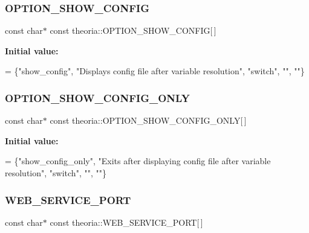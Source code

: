 \subsubsection{\texorpdfstring{O\+P\+T\+I\+O\+N\+\_\+\+S\+H\+O\+W\+\_\+\+C\+O\+N\+F\+IG}{OPTION\_SHOW\_CONFIG}}
{\footnotesize\ttfamily const char$\ast$ const theoria\+::\+O\+P\+T\+I\+O\+N\+\_\+\+S\+H\+O\+W\+\_\+\+C\+O\+N\+F\+IG\mbox{[}$\,$\mbox{]}}

{\bfseries Initial value\+:}
\begin{DoxyCode}
= 
        \{\textcolor{stringliteral}{"show\_config"}, \textcolor{stringliteral}{"Displays config file after variable resolution"}, \textcolor{stringliteral}{"switch"}, \textcolor{stringliteral}{""}, \textcolor{stringliteral}{""}\}
\end{DoxyCode}
\mbox{\label{namespacetheoria_a345844cd02fed47bf1d1b953b58c2aa1}} 
\subsubsection{\texorpdfstring{O\+P\+T\+I\+O\+N\+\_\+\+S\+H\+O\+W\+\_\+\+C\+O\+N\+F\+I\+G\+\_\+\+O\+N\+LY}{OPTION\_SHOW\_CONFIG\_ONLY}}
{\footnotesize\ttfamily const char$\ast$ const theoria\+::\+O\+P\+T\+I\+O\+N\+\_\+\+S\+H\+O\+W\+\_\+\+C\+O\+N\+F\+I\+G\+\_\+\+O\+N\+LY\mbox{[}$\,$\mbox{]}}

{\bfseries Initial value\+:}
\begin{DoxyCode}
= 
        \{\textcolor{stringliteral}{"show\_config\_only"}, \textcolor{stringliteral}{"Exits after displaying config file after variable resolution"}, \textcolor{stringliteral}{"switch"}, \textcolor{stringliteral}{""}, \textcolor{stringliteral}{
      ""}\}
\end{DoxyCode}
\mbox{\label{namespacetheoria_a9c1b4e850fda39d42d2690d74c4cb3d2}} 
\subsubsection{\texorpdfstring{W\+E\+B\+\_\+\+S\+E\+R\+V\+I\+C\+E\+\_\+\+P\+O\+RT}{WEB\_SERVICE\_PORT}}
{\footnotesize\ttfamily const char$\ast$ const theoria\+::\+W\+E\+B\+\_\+\+S\+E\+R\+V\+I\+C\+E\+\_\+\+P\+O\+RT\mbox{[}$\,$\mbox{]}}

